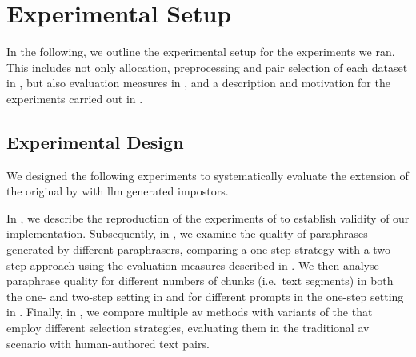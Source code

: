 \chapter{Experimental Setup}
\label{chap:experimental_setup}

In the following, we outline the experimental setup for the experiments we ran.
This includes not only allocation, preprocessing and pair selection of each dataset in , but also evaluation measures in , and a description and motivation for the experiments carried out in .






\section{Experimental Design}
\label{sec:experimental_setup}

We designed the following experiments to systematically evaluate the extension of the original \impAppr{} by \citet{koppel_determining_2014} with \ac{llm} generated impostors. 

In , we describe the reproduction of the experiments of \citet{koppel_determining_2014} to establish validity of our implementation.
Subsequently, in , we examine the quality of paraphrases generated by different paraphrasers, comparing a one-step strategy with a two-step approach using the evaluation measures described in .
We then analyse paraphrase quality for different numbers of chunks (i.e.\ text segments) in both the one- and two-step setting in  and for different prompts in the one-step setting in .
Finally, in , we compare multiple \ac{av} methods with variants of the \impAppr{} that employ different \imp{} selection strategies, evaluating them in the traditional \ac{av} scenario with human-authored text pairs.















